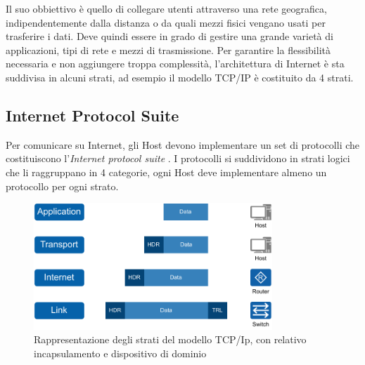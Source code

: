 Il suo obbiettivo è quello di collegare utenti attraverso una rete geografica, indipendentemente dalla distanza o da quali mezzi fisici vengano usati per trasferire i dati. Deve quindi essere in grado di gestire una grande varietà di applicazioni, tipi di rete e mezzi di trasmissione. Per garantire la flessibilità necessaria e non aggiungere troppa complessità, l'architettura di Internet è sta suddivisa in alcuni strati, ad esempio il modello TCP/IP è costituito da 4 strati. 

\newpage
\subsection{Internet Protocol Suite}

Per comunicare su Internet, gli Host devono implementare un set di protocolli che costituiscono l'\textit{Internet protocol suite} \cite{RFC_1122}. I protocolli si suddividono in strati logici che li raggruppano in 4 categorie, ogni Host deve implementare almeno un protocollo per ogni strato.

\begin{figure}[H]
    \centering
    \includegraphics[width=0.8\textwidth]{immagini/diag2-modello_a_strati}
    \caption{Rappresentazione degli strati del modello TCP/Ip, con relativo incapsulamento e dispositivo di dominio}
    \label{fig:modello-a-strati}
\end{figure}

